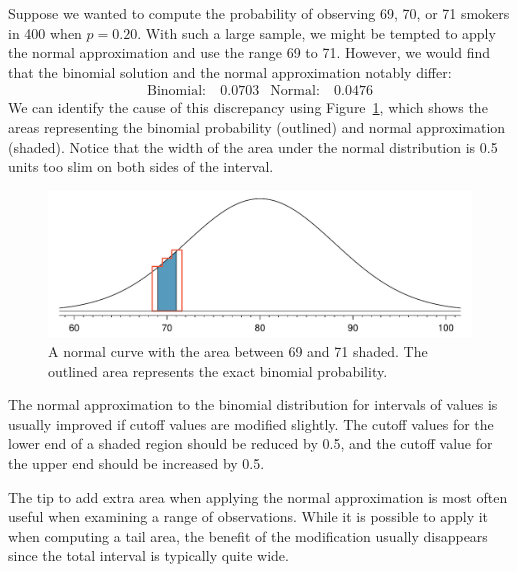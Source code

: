 Suppose we wanted to compute the probability of observing 69, 70, or 71 smokers in 400 when $p=0.20$. With such a large sample, we might be tempted to apply the normal approximation and use the range 69 to 71. However, we would find that the binomial solution and the normal approximation notably differ:
\begin{align*}
\text{Binomial:}&\ 0.0703
&\text{Normal:}&\ 0.0476
\end{align*}
We can identify the cause of this discrepancy using Figure~\ref{normApproxToBinomFail}, which shows the areas representing the binomial probability (outlined) and normal approximation (shaded). Notice that the width of the area under the normal distribution is 0.5 units too slim on both sides of the interval.

\begin{figure}[H]
\centering
\includegraphics[width=\textwidth]{03/figures/normApproxToBinomFail/normApproxToBinomFail}
\caption{A normal curve with the area between 69 and 71 shaded. The outlined area represents the exact binomial probability.}
\label{normApproxToBinomFail}
\end{figure}

\begin{tipBox}{
The normal approximation to the binomial distribution for intervals of values is usually improved if cutoff values are modified slightly. The cutoff values for the lower end of a shaded region should be reduced by 0.5, and the cutoff value for the upper end should be increased by 0.5.}
\end{tipBox}

The tip to add extra area when applying the normal approximation is most often useful when examining a range of observations. While it is possible to apply it when computing a tail area, the benefit of the modification usually disappears since the total interval is typically quite wide.









